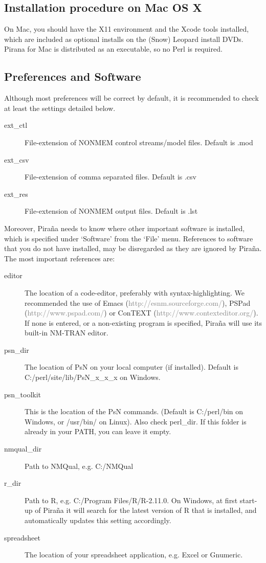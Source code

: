 \documentclass[a4,11pt]{report} \usepackage[pdftex]{graphicx}
\begin{document}
\subsection{Installation procedure on Mac OS X} On Mac, you should
have the X11 environment and the Xcode tools installed, which are
included as optional installs on the (Snow) Leopard install
DVDs. Pirana for Mac is distributed as an executable, so no Perl is
required. 

\subsection{Preferences and Software} Although most preferences
will be correct by default, it is recommended to check at
least the settings detailed below.
\begin{description}
  \item[ext\_ctl] File-extension of NONMEM control streams/model
files. Default is .mod
  \item[ext\_csv] File-extension of comma separated files. Default is
.csv
  \item[ext\_res] File-extension of NONMEM output files. Default is
.lst
\end{description} Moreover, Pira\~na needs to know where other
important software is installed, which is specified under `Software'
from the `File' menu. References to software that you do not have
installed, may be disregarded as they are ignored by Pira\~na. The
most important references are:
\begin{description}
\item[editor] The location of a code-editor, preferably with
  syntax-highlighting. We recommended the use of Emacs
  (\textcolor{Grey}{http://esnm.sourceforge.com/}), PSPad
  (\textcolor{Grey}{http://www.pspad.com/}) or ConTEXT
  (\textcolor{Grey}{http://www.contexteditor.org/}). If none is
  entered, or a non-existing program is specified, Pira\~na will use
  its built-in NM-TRAN editor.
\item[psn\_dir] The location of PsN on your local computer (if installed). Default is
C:/perl/site/lib/PsN\_x\_x\_x on Windows.
\item[psn\_toolkit] This is the location of the PsN commands. (Default
is C:/perl/bin on Windows, or /usr/bin/ on Linux). Also check
perl\_dir. If this folder is already in your PATH, you can leave it empty.
\item[nmqual\_dir] Path to NMQual, e.g. C:/NMQual
\item[r\_dir] Path to R, e.g. C:/Program Files/R/R-2.11.0. On Windows,
  at first start-up of Pira\~na it will search for the latest version
  of R that is installed, and automatically updates this setting
  accordingly.
  \item[spreadsheet] The location of your spreadsheet application,
    e.g. Excel or Gnumeric.
\end{description}
\end{document}
